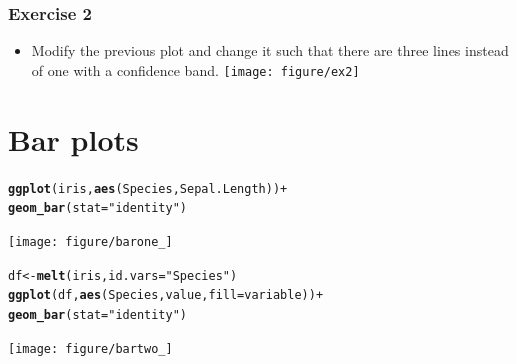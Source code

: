 \documentclass{beamer}\usepackage{graphicx, color}
\makeatletter
\newcommand{\hlfunctioncall}[1]{\textcolor[rgb]{0.501960784313725,0,0.329411764705882}{\textbf{#1}}}%
\newcommand{\hlstring}[1]{\textcolor[rgb]{0.6,0.6,1}{#1}}%
\newenvironment{kframe}{%
 \def\at@end@of@kframe{}%
 \ifinner\ifhmode%
  \def\at@end@of@kframe{\end{minipage}}%
  \begin{minipage}{\columnwidth}%
 \fi\fi%
 \def\FrameCommand##1{\hskip\@totalleftmargin \hskip-\fboxsep
 \colorbox{shadecolor}{##1}\hskip-\fboxsep
     \hskip-\linewidth \hskip-\@totalleftmargin \hskip\columnwidth}%
 \MakeFramed {\advance\hsize-\width
   \@totalleftmargin\z@ \linewidth\hsize
   \@setminipage}}%
 {\par\unskip\endMakeFramed%
 \at@end@of@kframe}
\newenvironment{knitrout}{}{} %
\makeatother
\begin{document}
\begin{frame}[fragile]
\frametitle{Exercise 2}
\begin{itemize}
\item Modify the previous plot and change it such that there are three lines instead of one with a confidence band.
\begin{knitrout}\footnotesize
{}\color{fgcolor}
\texttt{[image: figure/ex2]} 

\end{knitrout}


\end{itemize}
\end{frame}


\section*{Bar plots}
\frame{\sectionpage}

\begin{frame}[fragile]
\begin{knitrout}\footnotesize
{}\color{fgcolor}\begin{kframe}
\begin{alltt}
\hlfunctioncall{ggplot}(iris, \hlfunctioncall{aes}(Species, Sepal.Length)) +
\hlfunctioncall{geom_bar}(stat = \hlstring{"identity"})
\end{alltt}
\end{kframe}
\texttt{[image: figure/barone\_]} 

\end{knitrout}

\end{frame}

\begin{frame}[fragile]
\begin{knitrout}\footnotesize
{}\color{fgcolor}\begin{kframe}
\begin{alltt}
df  <- \hlfunctioncall{melt}(iris, id.vars = \hlstring{"Species"})
\hlfunctioncall{ggplot}(df, \hlfunctioncall{aes}(Species, value, fill = variable)) +
\hlfunctioncall{geom_bar}(stat = \hlstring{"identity"})
\end{alltt}
\end{kframe}
\texttt{[image: figure/bartwo\_]} 

\end{knitrout}

\end{frame}
\end{document}
